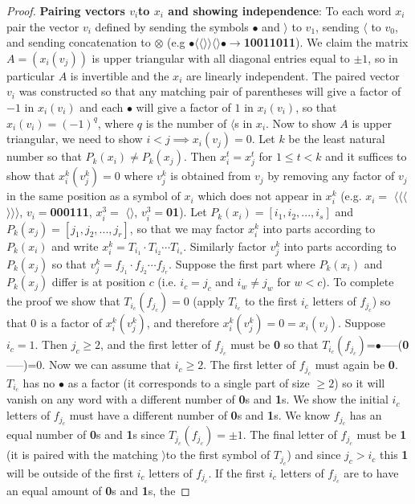 \documentclass[11pt]{article} %
\newcommand{\lcap}{\boldmath$\langle$\unboldmath}
\newcommand{\rcap}{\boldmath$\rangle$\unboldmath}
\newcommand{\dotmap}{$\bullet$}
\begin{document}
\begin{proof}
\textbf{Pairing vectors \boldmath$v_i$\unboldmath\hspace{1mm}to \boldmath$x_i$\unboldmath\hspace{1mm} and showing independence}: To each word $x_i$ pair the vector $v_i$ defined by sending the symbols \dotmap\hspace{1mm} and \rcap\hspace{1mm} to $v_1$, sending \lcap\hspace{1mm} to $v_0$, and sending concatenation to $\otimes$ (e.g \dotmap\lcap\lcap\rcap\rcap\lcap\rcap\dotmap\hspace{1mm}$\rightarrow$\textbf{10011011}). We claim the matrix $A = (x_i(v_j))$ is upper triangular with all diagonal entries equal to $\pm 1$, so in particular $A$ is invertible and the $x_i$ are linearly independent. The paired vector $v_i$ was constructed so that any matching pair of parentheses will give a factor of $-1$ in $x_i(v_i)$ and each \dotmap\hspace{1mm} will give a factor of $1$ in $x_i(v_i)$, so that $x_i(v_i)=(-1)^q$, where $q$ is the number of \lcap s in $x_i$. Now to show $A$ is upper triangular, we need to show $i < j \implies x_i(v_j)=0$. Let $k$ be the least natural number so that $P_k(x_i) \neq P_k(x_j)$. Then $x_i^t=x_j^t$ for $1 \leq t < k$ and it suffices to show that $x_i^k(v_j^k)=0$ where $v_j^k$ is obtained from $v_j$ by removing any factor of $v_j$ in the same position as a symbol of $x_i$ which does not appear in $x_i^k$ (e.g. $x_i =$ \lcap\lcap\lcap\rcap\rcap\rcap, $v_i=$\textbf{000111}, $x_i^3=$ \lcap\rcap, $v_i^3=$\textbf{01}). Let $P_k(x_i)=[i_1,i_2,...,i_s]$ and $P_k(x_j)=[j_1,j_2,...,j_r]$, so that we may factor $x_i^k$ into parts according to $P_k(x_i)$ and write $x_i^k=T_{i_1}\cdot T_{i_2}\cdots T_{i_s}$. Similarly factor $v_j^k$ into parts according to $P_k(x_j)$ so that $v_j^k=f_{j_1}\cdot f_{j_2} \cdots f_{j_r}$. Suppose the first part where $P_k(x_i)$ and $P_k(x_j)$ differ is at position $c$ (i.e. $i_c = j_c$ and $i_w \neq j_w$ for $w < c$). To complete the proof we show that $T_{i_c}(f_{j_c})=0$ (apply $T_{i_c}$ to the first $i_c$ letters of $f_{j_c}$) so that $0$ is a factor of $x_i^k(v_j^k)$, and therefore $x_i^k(v_j^k)=0=x_i(v_j)$. Suppose $i_c=1$. Then $j_c \geq 2$, and the first letter of $f_{j_c}$ must be \textbf{0} so that $T_{i_c}(f_{j_c})$=\dotmap-----(\textbf{0}-----)=0. Now we can assume that $i_c \geq 2$. The first letter of $f_{j_c}$ must again be \textbf{0}. $T_{i_c}$ has no \dotmap\hspace{1mm} as a factor (it corresponds to a single part of size $\geq 2$) so it will vanish on any word with a different number of \textbf{0}s and \textbf{1}s. We show the initial $i_c$ letters of $f_{j_c}$ must have a different number of \textbf{0}s and \textbf{1}s. We know $f_{j_c}$ has an equal number of \textbf{0}s and \textbf{1}s since $T_{j_c}(f_{j_c}) = \pm 1$. The final letter of $f_{j_c}$ must be \textbf{1} (it is paired with the matching \rcap\hspace{1mm}to the first symbol of $T_{j_c}$) and since $j_c > i_c$ this \textbf{1} will be outside of the first $i_c$ letters of $f_{j_c}$. If the first $i_c$ letters of $f_{j_c}$ are to have an equal amount of \textbf{0}s and \textbf{1}s, the 
\end{proof}
\end{document}
